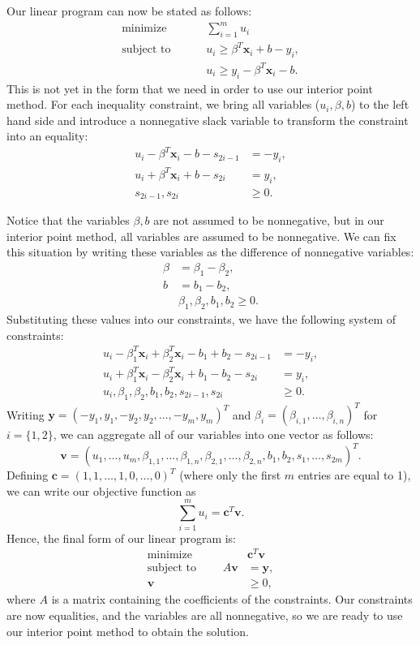 Our linear program can now be stated as follows:
\begin{align*}
\text{minimize }\qquad &\sum_{i=1}^m u_i\\
\text{subject to }\qquad &u_i \geq \beta^T\mathbf{x}_i + b - y_i,\\
&u_i \geq y_i - \beta^T\mathbf{x}_i - b.
\end{align*}
This is not yet in the form that we need in order to use our interior point method.
For each inequality constraint, we bring all variables ($u_i, \beta, b$) to the left hand side and introduce a nonnegative slack variable to transform the constraint into an equality:
\begin{align*}
u_i  - \beta^T\mathbf{x}_i - b - s_{2i-1}&= -y_i,\\
u_i +\beta^T\mathbf{x}_i + b - s_{2i}&= y_i,\\
s_{2i-1}, s_{2i}&\geq 0.
\end{align*}

Notice that the variables $\beta, b$ are not assumed to be nonnegative, but in our interior point method, all variables are assumed to be nonnegative.
We can fix this situation by writing these variables as the difference of nonnegative variables:
\begin{align*}
  \beta &= \beta_1 - \beta_2,\\
  b &= b_1 - b_2,\\
  &\beta_1, \beta_2, b_1, b_2 \geq 0.
\end{align*}
Substituting these values into our constraints, we have the following system of constraints:
\begin{align*}
u_i  - \beta_1^T\mathbf{x}_i + \beta_2^T\mathbf{x}_i - b_1 + b_2 - s_{2i-1}&= -y_i,\\
u_i + \beta_1^T\mathbf{x}_i - \beta_2^T\mathbf{x}_i + b_1 - b_2 - s_{2i}&= y_i,\\
u_i, \beta_1, \beta_2, b_1, b_2, s_{2i-1}, s_{2i}&\geq 0.
\end{align*}
Writing $\mathbf{y} = (-y_1, y_1, -y_2, y_2, \ldots, -y_m, y_m)^T$ and $\beta_i = (\beta_{i,1}, \ldots, \beta_{i,n})^T$ for $i = \{1, 2\}$, we can aggregate all of our variables into one vector as follows:
\[
\mathbf{v} = (u_1,\ldots, u_m, \beta_{1,1},\ldots, \beta_{1,n}, \beta_{2,1},\ldots, \beta_{2,n}, b_1, b_2, s_1,\ldots,s_{2m})^T.
\]
Defining $\mathbf{c} = (1, 1, \ldots, 1, 0, \ldots, 0)^T$ (where only the first $m$ entries are equal to 1), we can write our objective function as
\[
\sum_{i=1}^m u_i = \mathbf{c}^T\mathbf{v}.
\]
Hence, the final form of our linear program is:
\begin{align*}
  \text{minimize }\qquad &\mathbf{c}^T\mathbf{v}\\
  \text{subject to }\qquad A\mathbf{v} &= \mathbf{y},\\
  \mathbf{v} &\geq 0,
\end{align*}
where $A$ is a matrix containing the coefficients of the constraints.
Our constraints are now equalities, and the variables are all nonnegative, so we are ready to use our interior point method to obtain the solution.

